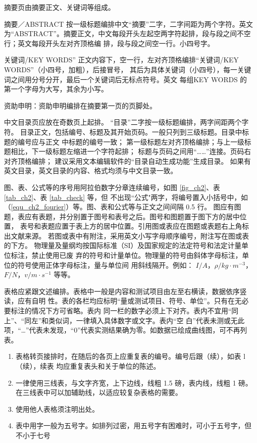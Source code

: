 摘要页由摘要正文、关键词等组成。

摘要／ABSTRACT 按一级标题编排中文“摘要”二字，二字间距为两个字符。英文为“ABSTRACT”。摘要正文，中文每段开头左起空两字符起排，段与段之间不空行；英文每段开头左对齐顶格编
排，段与段之间空一行。小四号字。 

关键词/KEY WORDS” 正文内容下，空一行，左对齐顶格编排“关键词/KEY WORDS”（小四号，加粗），后接冒号， 其后为具体关键词（小四号），每一关键词之间用分号分开，最后一个关键词后无标点符号。英文 每组KEY WORDS 的第一个字母为大写，其余为小写。

资助申明：资助申明编排在摘要第一页的页脚处。

中文目录页应放在奇数页上起排。 “目录”二字按一级标题编排，两字间距两个字符。 目录正文，包括编号、标题及其开始页码。一般只列到三级标题。目录中标题的编号应与正文
中标题的编号一致； 第一级标题左对齐顶格编排；与上一级标题相比，下一级标题左缩进一个字符起排； 标题与页码之间用“……”连接。页码右对齐顶格编排； 建议采用文本编辑软件的“目录自动生成功能”生成目录。 如果有英文目录，英文目录的内容、格式均须与中文目录一致。

图、表、公式等的序号用阿拉伯数字分章连续编号，如图 \ref{fig_ch2}、表 \ref{tab_ch2}、表 \ref{tab_check} 等，但
不出现“公式"两字，将编号置入小括号中，如（\ref{equ_ch2_fourier}）等。图、表和公式等与正文之间间隔 0.5 行。 图应有图题，表应有表题，并分别置于图号和表号之后。图号和图题置于图下方的居中位置，
表号和表题应置于表上方的居中位置。引用图或表应在图题或表题右上角标出文献来源。 若图或表中有附注，采用英文小写字母顺序编号，附注写在图或表的下方。 物理量及量纲均按国际标准（SI）及国家规定的法定符号和法定计量单位标注，禁止使用已废
弃的符号和计量单位。物理量的符号由斜体字母标注，单位的符号使用正体字母标注，量与单位间 用斜线隔开。例如： $I/A$，$\rho/kg \cdot m^{-3}$，$F/N$，$v/m \cdot s^{-1}$ 等等。

表格应紧跟文述编排。表格中一般是内容和测试项目由左至右横读，数据依序竖读，应有自明 性。表的各栏均应标明“量或测试项目、符号、单位”。只有在无必要标注的情况下方可省略。表内 同一栏的数字必须上下对齐。表内不宜用“同上”、“同左”和类似词，一律填入具体数字或文字。表内“空 白”代表未测或无此项，“…”代表未发现，“0”代表实测结果确为零。如数据已绘成曲线图，可不再列 表。

\begin{enumerate}[wide, label=\arabic*),  labelindent=21pt]
    \item 表格转页接排时，在随后的各页上应重复表的编号。编号后跟（续），如表 l（续），续表
均应重复表头和关于单位的陈述。
    \item 一律使用三线表，与文字齐宽，上下边线，线粗 1.5 磅，表内线，线粗 1 磅。在三线表中可以加辅助线，以适应较复杂表格的需要。
    \item 使用他人表格须注明出处。
    \item 表中用字一般为五号字。如排列过密，用五号字有困难时，可小于五号字，但不小于七号
\end{enumerate}


